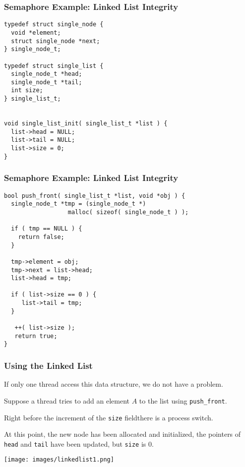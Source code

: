 \begin{frame}[fragile]
\frametitle{Semaphore Example: Linked List Integrity}

\begin{verbatim}
typedef struct single_node {
  void *element;
  struct single_node *next;
} single_node_t;

typedef struct single_list {
  single_node_t *head;
  single_node_t *tail;
  int size;
} single_list_t;


void single_list_init( single_list_t *list ) {
  list->head = NULL;
  list->tail = NULL;
  list->size = 0;
}
\end{verbatim}
\end{frame}

\begin{frame}[fragile]
\frametitle{Semaphore Example: Linked List Integrity}

\begin{verbatim}
bool push_front( single_list_t *list, void *obj ) {
  single_node_t *tmp = (single_node_t *) 
                  malloc( sizeof( single_node_t ) );
  
  if ( tmp == NULL ) {
    return false;
  }
  
  tmp->element = obj;
  tmp->next = list->head;
  list->head = tmp;

  if ( list->size == 0 ) {
     list->tail = tmp;
  }
  
   ++( list->size );
   return true;
}

\end{verbatim}
\end{frame}


\begin{frame}
\frametitle{Using the Linked List}

If only one thread access this data structure, we do not have a problem.

Suppose a thread tries to add an element $A$ to the list using \texttt{push\_front}. 

Right before the increment of the \texttt{size} fieldthere is a process switch. 

At this point, the new node has been allocated and initialized, the pointers of \texttt{head} and \texttt{tail} have been updated, but \texttt{size} is 0. 

\begin{center}
\texttt{[image: images/linkedlist1.png]}
\end{center}

\end{frame}

